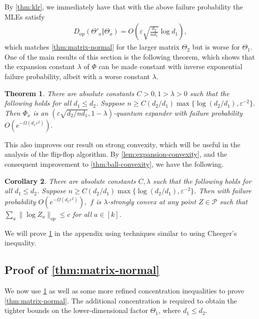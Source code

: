 \documentclass[aos]{imsart}
\newtheorem{theorem}{Theorem}[section]
\newtheorem{corollary}[theorem]{Corollary}
\theoremstyle{definition}
\numberwithin{equation}{section}
\DeclareMathOperator{\op}{op}
\newcommand{\eps}{\varepsilon}
\newcommand{\SPD}{\mathcal{P}}
\newcommand{\samp}{x}
\begin{document}
By \cref{thm:klr}, we immediately have that with the above failure probability the MLEs satisfy
\begin{align*}
  D_{\op}(\Theta'_a \Vert \Theta_a) = O\left(\eps \sqrt{\frac{d_{2}}{n d_1}} \log d_1\right),
\end{align*}
which matches \cref{thm:matrix-normal} for the larger matrix $\Theta_2$ but is worse for $\Theta_1$. One of the main results of this section is the following theorem, which shows that the expansion constant $\lambda$ of $\Phi$ can be made constant with inverse exponential failure probability, albeit with a worse constant $\lambda$.

\begin{theorem}\label{thm:operator-cheeger}
There are absolute constants $ C > 0, 1 > \lambda > 0$ such that the following holds for all $d_1 \leq d_2$. Suppose $n \geq C (d_2/d_1) \max\{\log (d_2/d_1),  \eps^{-2}\} $. Then $\Phi_\samp$ is an $(\eps \sqrt{d_2/n d_1}, 1 - \lambda)$-quantum expander with failure probability $O(e^{ - \Omega( d_1 \eps^2)}).$
\end{theorem}
This also improves our result on strong convexity, which will be useful in the analysis of the flip-flop algorithm. By \cref{lem:expansion-convexity}, and the consequent improvement to \cref{thm:ball-convexity}, we have the following.
\begin{corollary}\label{cor:matrix-convexity} There are absolute constants $C, \lambda$ such that the following holds for all $d_1 \leq d_2$. Suppose $n \geq C (d_2/d_1) \max\{\log (d_2/d_1),  \eps^{-2}\} $. Then with failure probability $O(e^{ - \Omega( d_1 \eps^2)}),$ $f$ is $\lambda$-strongly convex at any point $Z \in \SPD$ such that $\sum_a \|\log Z_a\|_{op} \leq c$ for all $a \in [k]$.
\end{corollary}

We will prove \cref{thm:operator-cheeger} in the appendix using techniques similar to \cite{FM20} using Cheeger's inequality.

\subsection{Proof of \cref{thm:matrix-normal}}
We now use \cref{thm:operator-cheeger} as well as some more refined concentration inequalities to prove \cref{thm:matrix-normal}. The additional concentration is required to obtain the tighter bounds on the lower-dimensional factor $\Theta_1$, where $d_1 \leq d_2$.
\end{document}

